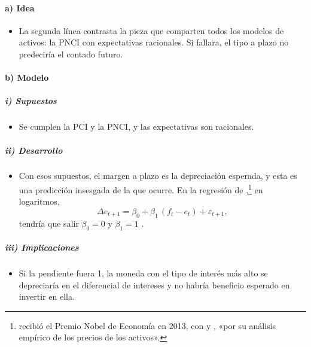 \documentclass[11pt]{article}
\begin{document}
\paragraph{a) Idea}
\begin{itemize}
\item La segunda línea contrasta la pieza que comparten todos los modelos de activos: la PNCI con expectativas racionales. Si fallara, el tipo a plazo no predeciría el contado futuro.
\end{itemize}

\paragraph{b) Modelo}
\subparagraph{i) Supuestos}
\begin{itemize}
\item Se cumplen la PCI y la PNCI, y las expectativas son racionales.
\end{itemize}

\subparagraph{ii) Desarrollo}
\begin{itemize}
\item Con esos supuestos, el margen a plazo es la depreciación esperada, y esta es una predicción insesgada de la que ocurre. En la regresión de \textcite{Fama1984Forward},\footnote{ recibió el Premio Nobel de Economía en 2013, con  y , «por su análisis empírico de los precios de los activos»\nocite{Nobel2013FamaHansenShiller}.} en logaritmos,
  \begin{equation}\label{eq:fama-tc}
  \Delta e_{t+1}=\beta_0+\beta_1\,(f_t-e_t)+\varepsilon_{t+1},
  \end{equation}
  tendría que salir $\beta_0=0$ y $\beta_1=1$ .
\end{itemize}

\subparagraph{iii) Implicaciones}
\begin{itemize}
\item Si la pendiente fuera 1, la moneda con el tipo de interés más alto se depreciaría en el diferencial de intereses y no habría beneficio esperado en invertir en ella.
\end{itemize}
\end{document}
